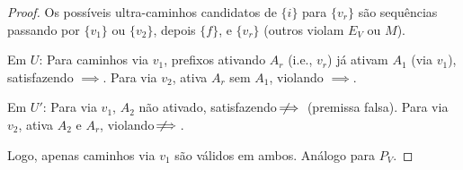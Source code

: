 \documentclass{article}
\begin{document}
\begin{proof}
Os possíveis ultra-caminhos candidatos de \( \{i\} \) para \( \{v_r\} \) são sequências passando por \( \{v_1\} \) ou \( \{v_2\} \), depois \( \{f\} \), e \( \{v_r\} \) (outros violam \( E_V \) ou \( M \)).

Em \( U \): Para caminhos via \( v_1 \), prefixos ativando \( A_r \) (i.e., \( v_r \)) já ativam \( A_1 \) (via \( v_1 \)), satisfazendo \( \implies \). Para via \( v_2 \), ativa \( A_r \) sem \( A_1 \), violando \( \implies \).

Em \( U' \): Para via \( v_1 \), \( A_2 \) não ativado, satisfazendo \( \not\!\!\!\implies \) (premissa falsa). Para via \( v_2 \), ativa \( A_2 \) e \( A_r \), violando \( \not\!\!\!\implies \).

Logo, apenas caminhos via \( v_1 \) são válidos em ambos. Análogo para \( P_V \).
\end{proof}
\end{document}
